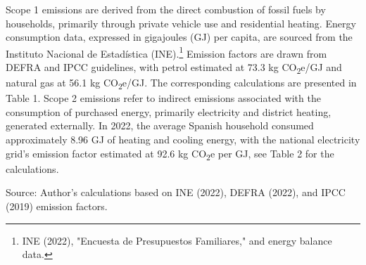 \documentclass[12pt,a4paper]{article}%
\begin{document}
Scope 1 emissions are derived from the direct combustion of fossil fuels by households, primarily through private vehicle use and residential heating. Energy consumption data, expressed in gigajoules (GJ) per capita, are sourced from the Instituto Nacional de Estadística (INE).\footnote{INE (2022), "Encuesta de Presupuestos Familiares," and energy balance data.} Emission factors are drawn from DEFRA and IPCC guidelines, with petrol estimated at 73.3 kg CO\textsubscript{2}e/GJ and natural gas at 56.1 kg CO\textsubscript{2}e/GJ. The corresponding calculations are presented in Table 1. Scope 2 emissions refer to indirect emissions associated with the consumption of purchased energy, primarily electricity and district heating, generated externally. In 2022, the average Spanish household consumed approximately 8.96 GJ of heating and cooling energy, with the national electricity grid's emission factor estimated at 92.6 kg CO\textsubscript{2}e per GJ, see Table 2 for the calculations.


\begin{table}[h]
\centering
\captionsetup{justification=raggedright,singlelinecheck=false} 
\caption{\small Direct Emissions from Household Energy and Transport (Scope 1)}\label{tab:scope1}
\raggedright

\vspace{0.3cm}
\footnotesize{Source: Author's calculations based on INE (2022), DEFRA (2022), and IPCC (2019) emission factors.}
\end{table}
\end{document}
